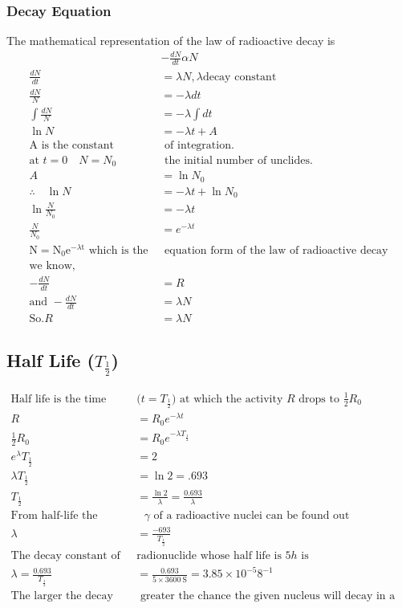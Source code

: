 \subsubsection{Decay Equation}
The mathematical representation of the law of radioactive decay is 
\begin{align}
&-\frac{d N}{d t} \alpha N\\
\frac{d N}{d t}&=\lambda N, \lambda \text{decay constant}\\
\frac{d N}{N}&=-\lambda d t\\
\int \frac{d N}{N}&=-\lambda \int d t\\
\ln N&=-\lambda t+A\\
\text{A is the constant}&\text{ of integration.}\\
\text{at $t=0 \quad N=N_{0}$}&\text{ the initial number of unclides.}\\
A&=\ln N_{0}\\
\therefore \quad \ln N&=-\lambda t+\ln N _0\\
\ln \frac{N }{ N_{0}}&=-\lambda t\\
\frac{N}{N_0}&=e^{-\lambda t}\\
\text{$\mathrm{N}=\mathrm{N}_{0} \mathrm{e}^{-\lambda \mathrm{t}}$ which is the }&\text{  equation form of the law of radioactive decay}\\
\text{we know,}\quad\\
-\frac{d N}{d t}&=R \label{nuclear decay eq}\\
\text{and }-\frac{d N}{d t}&=\lambda N\label{nuclear decay eq 2}\\
\text{So.} R&=\lambda N
\end{align}
\subsection{Half Life ($T_\frac{1}{2}$)}
\begin{align*}
\text{Half life is the time }&\text{($t=T_\frac{1}{2}$) at which the activity $R$ drops to $\frac{1}{2}R_0$}\\
R&=R_{0} e^{-\lambda t}\\
\frac{1}{2} R_{0}&=R _0 e^{-\lambda T_\frac{1}{2}}\\
e^\lambda T_\frac{1}{2}&=2\\
\lambda T_\frac{1}{2}&=\ln 2=.693\\
T_\frac{1}{2}&=\frac{\ln 2}{\lambda}=\frac{0.693}{\lambda}\\
\text{From half-life the decay constant}&\text{ $\gamma$ of a radioactive nuclei can be found out }\\
\lambda&=\frac{-693}{T_\frac{1}{2}}\\
\text{The decay constant of }&\text{radionuclide whose half life is $5 h$ is}\\
\lambda=\frac{0.693}{T _\frac{1}{2}}&=\frac{0.693}{5 \times 3600 \mathrm{~S}}=3.85 \times 10^{-5} 8^{-1}\\
\text{The larger the decay constant, the}&\text{ greater the chance the given nucleus will decay in a certain period of time}
\end{align*}
